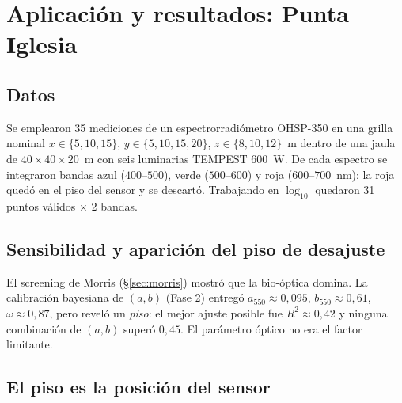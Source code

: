 
\section{Aplicación y resultados: Punta Iglesia}\label{sec:resultados}

\subsection{Datos}

Se emplearon 35 mediciones de un espectrorradiómetro OHSP-350 en una grilla nominal
$x\in\{5,10,15\}$, $y\in\{5,10,15,20\}$, $z\in\{8,10,12\}$~\si{\meter} dentro de una
jaula de $40\times40\times20$~\si{\meter} con seis luminarias TEMPEST 600~W. De cada
espectro se integraron bandas azul ($400$--$500$), verde ($500$--$600$) y roja
($600$--$700$~\si{\nano\meter}); la roja quedó en el piso del sensor y se descartó.
Trabajando en $\log_{10}$ quedaron 31 puntos válidos $\times$ 2 bandas.


\subsection{Sensibilidad y aparición del piso de desajuste}

El screening de Morris (\S\ref{sec:morris}) mostró que la bio-óptica domina. La
calibración bayesiana de $(a,b)$ (Fase 2) entregó $a_{550}\approx0{,}095$,
$b_{550}\approx0{,}61$, $\omega\approx0{,}87$, pero reveló un \emph{piso}: el mejor
ajuste posible fue $R^2\approx0{,}42$ y ninguna combinación de $(a,b)$ superó
$0{,}45$. El parámetro óptico no era el factor limitante.

\subsection{El piso es la posición del sensor}

